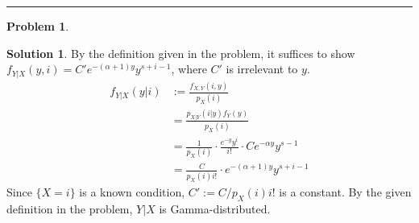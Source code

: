 \documentclass[a4paper, 10pt]{article}
\theoremstyle{definition}
\newtheorem{problem}{Problem}
\theoremstyle{hSol}
\newtheorem*{solution}{Solution}
\begin{document}
\noindent\rule{16cm}{0.4pt}
\begin{problem} 
\end{problem}
\begin{solution} By the definition given in the problem, it suffices to show $f_{Y|X}(y,i)=C'e^{-(\alpha+1)y}y^{s+i-1}$, where $C'$ is irrelevant to $y$.
\begin{equation}
  \begin{split}
    f_{Y|X}(y|i) &:= \frac{f_{X,Y}(i,y)}{p_X(i)} \\
    & = \frac{p_{X|Y}(i|y)f_{Y}(y)}{p_X(i)} \\
    & = \frac{1}{p_X(i)} \cdot \frac{e^{-y}y^i}{i!} \cdot Ce^{-\alpha y}y^{s-1} \\
    & = \frac{C}{p_X(i)i!} \cdot e^{-(\alpha+1)y}y^{s+i-1}
  \end{split}
\end{equation}
Since $\{X=i\}$ is a known condition, $C':=C/p_X(i)i!$ is a constant. By the given definition in the problem, $Y|X$ is Gamma-distributed.
\end{solution}
\end{document}
